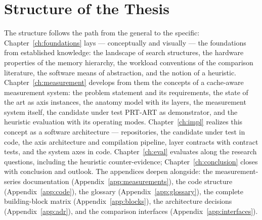 \section{Structure of the Thesis}\label{sec:structure}
The structure follows the path from the general to the specific: Chapter~\ref{ch:foundations} lays --- conceptually
and visually --- the foundations from established knowledge: the landscape of search structures, the
hardware properties of the memory hierarchy, the workload conventions of the comparison literature, the
software means of abstraction, and the notion of a heuristic. Chapter~\ref{ch:measurement} develops
from them the concepts of a cache-aware measurement system: the problem statement and its
requirements, the state of the art as axis instances, the anatomy model with its layers, the
measurement system itself, the candidate under test PRT-ART as demonstrator, and the heuristic evaluation
with its operating modes. Chapter~\ref{ch:impl} realizes this concept as a software architecture ---
repositories, the candidate under test in code, the axis architecture and compilation pipeline, layer
contracts with contract tests, and the system axes in code. Chapter~\ref{ch:eval} evaluates along the
research questions, including the heuristic counter-evidence; Chapter~\ref{ch:conclusion} closes with
conclusion and outlook. The appendices deepen alongside: the measurement-series documentation
(Appendix~\ref{app:measurements}), the code structure (Appendix~\ref{app:code}), the glossary
(Appendix~\ref{app:glossary}), the complete building-block matrix (Appendix~\ref{app:blocks}), the
architecture decisions (Appendix~\ref{app:adr}), and the comparison interfaces
(Appendix~\ref{app:interfaces}).
